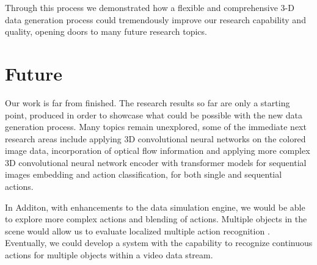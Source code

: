 \documentclass[
	a4paper, %
	10pt, %
	unnumberedsections, %
	twoside, %
]{t0004}
\begin{document}
Through this process we demonstrated how a flexible and comprehensive 3-D data generation process could tremendously improve our research capability and quality, opening doors to many future research topics.

\section{Future}

Our work is far from finished. The research results so far are only a starting point, produced in order to showcase what could be possible with the new data generation process. Many topics remain unexplored, some of the immediate next research areas include applying 3D convolutional neural networks on the colored image data, incorporation of optical flow information and applying more complex 3D convolutional neural network encoder with transformer models for sequential images embedding and action classification, for both single and sequential actions.

In Additon, with enhancements to the data simulation engine, we would be able to explore more complex actions and blending of actions. Multiple objects in the scene would allow us to evaluate localized multiple action recognition \cite{Wu:2023qr}. Eventually, we could develop a system with the capability to recognize continuous actions for multiple objects within a video data stream.
\end{document}
